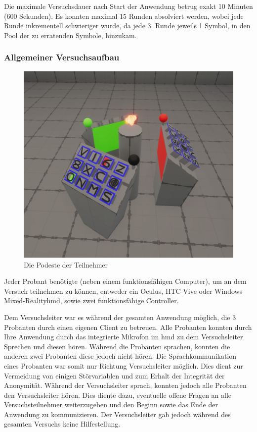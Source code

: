 \documentclass[a4paper,11pt]{article}%
\renewcommand{\\}{\vspace*{0.5\baselineskip} \newline}
\begin{document}
Die maximale Versuchsdauer nach Start der Anwendung betrug exakt 10 Minuten (600 Sekunden). Es konnten maximal 15 Runden absolviert werden, wobei jede Runde inkrementell schwieriger wurde, da jede 3. Runde jeweils 1 Symbol, in den Pool der zu erratenden Symbole, hinzukam. 

	\subsubsection{Allgemeiner Versuchsaufbau}

\begin{figure}[H]
		\begin{footnotesize}
			\includegraphics[width=\textwidth]{Abbildungen/Podeste.JPG}\\
			\caption[Abbildung 1]{Die Podeste der Teilnehmer}
			\label{Framework}
		\end{footnotesize}
	\end{figure}

Jeder Probant benötigte (neben einem funktionsfähigen Computer), um an dem Versuch teilnehmen zu können, entweder ein Oculus, HTC-Vive oder Windows Mixed-Reality\ac{hmd}, sowie zwei funktionsfähige Controller.

Dem Versuchsleiter war es während der gesamten Anwendung möglich, die 3 Probanten durch einen eigenen Client zu betreuen. Alle Probanten konnten durch Ihre Anwendung durch das integrierte Mikrofon im \ac{hmd} zu dem Versuchsleiter Sprechen und diesen hören. Während die Probanten sprachen, konnten die anderen zwei Probanten diese jedoch nicht hören. Die Sprachkommunikation eines Probanten war somit nur Richtung Versuchsleiter möglich. Dies dient zur Vermeidung von einigen Störvariablen und zum Erhalt der Integrität der Anonymität.
Während der Versuchsleiter sprach, konnten jedoch alle Probanten den Versuchsleiter hören. Dies diente dazu, eventuelle offene Fragen an alle Versuchsteilnehmer weiterzugeben und den Beginn sowie das Ende der Anwendung zu kommunizieren. Der Versuchsleiter gab jedoch während des gesamten Versuchs keine Hilfestellung.
\end{document}
